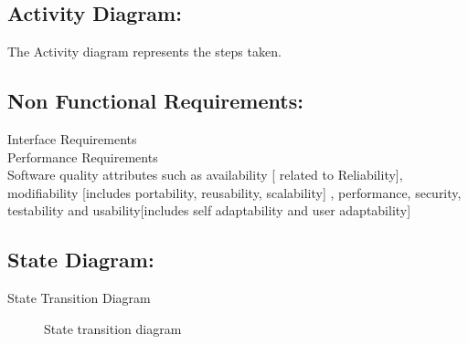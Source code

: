 \documentclass[oneside,a4paper,12pt]{report}
\begin{document}
 
\subsection{Activity Diagram:}
The Activity diagram represents the steps taken.

\subsection{Non Functional Requirements:}
Interface Requirements\\
Performance Requirements\\
Software quality attributes such as availability [ related to Reliability], modifiability [includes portability, reusability, scalability] , performance, security, testability and usability[includes self adaptability and user adaptability] \\

\subsection{State Diagram:}	
  State Transition Diagram\\

\begin{center}
	\begin{figure}[!htbp]
		\centering
	  \caption{State transition diagram}
	  \label{fig:state-dig}
	\end{figure}
\end{center} 
\newpage
\end{document}
